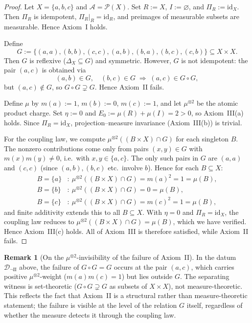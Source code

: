 \documentclass[11pt]{article}
\numberwithin{equation}{section}
\theoremstyle{definition}
\newtheorem{remark}[theorem]{Remark}
\begin{document}
\begin{proof}
Let $X=\{a,b,c\}$ and $\mathcal A=\mathcal P(X)$. Set $R:=X$, $I:=\varnothing$, and $\Pi_R:=\mathrm{id}_X$. Then $\Pi_R$ is idempotent, $\Pi_R|_R=\mathrm{id}_R$, and preimages of measurable subsets are measurable. Hence Axiom~I holds.

Define
\[
G:=\{(a,a),(b,b),(c,c),(a,b),(b,a),(b,c),(c,b)\}\subseteq X\times X.
\]
Then $G$ is reflexive ($\Delta_X\subseteq G$) and symmetric. However, $G$ is not idempotent: the pair $(a,c)$ is obtained via
\[
(a,b)\in G,\quad (b,c)\in G \;\Longrightarrow\; (a,c)\in G\circ G,
\]
but $(a,c)\notin G$, so $G\circ G\supsetneq G$. Hence Axiom~II fails.

Define $\mu$ by $m(a):=1$, $m(b):=0$, $m(c):=1$, and let $\mu^{\otimes2}$ be the atomic product charge. Set $\eta:=0$ and $E_0:=\mu(R)+\mu(I)=2>0$, so Axiom~III(a) holds. Since $\Pi_R=\mathrm{id}_X$, projection--measure invariance (Axiom~III(b)) is trivial.

For the coupling law, we compute $\mu^{\otimes2}((B\times X)\cap G)$ for each singleton $B$. The nonzero contributions come only from pairs $(x,y)\in G$ with $m(x)m(y)\ne 0$, i.e.\ with $x,y\in\{a,c\}$. The only such pairs in $G$ are $(a,a)$ and $(c,c)$ (since $(a,b),(b,c)$ etc.\ involve $b$). Hence for each $B\subseteq X$:
\begin{align*}
B=\{a\}&:\ \mu^{\otimes2}((B\times X)\cap G)=m(a)^2=1=\mu(B),\\
B=\{b\}&:\ \mu^{\otimes2}((B\times X)\cap G)=0=\mu(B),\\
B=\{c\}&:\ \mu^{\otimes2}((B\times X)\cap G)=m(c)^2=1=\mu(B),
\end{align*}
and finite additivity extends this to all $B\subseteq X$. With $\eta=0$ and $\Pi_R=\mathrm{id}_X$, the coupling law reduces to $\mu^{\otimes2}((B\times X)\cap G)=\mu(B)$, which we have verified. Hence Axiom~III(c) holds. All of Axiom~III is therefore satisfied, while Axiom~II fails.
\end{proof}

\begin{remark}[On the $\mu^{\otimes2}$-invisibility of the failure of Axiom~II]\label{rem:II-invisibility}
In the datum $\mathcal D_{\neg \mathrm{II}}$ above, the failure of $G\circ G=G$ occurs at the pair $(a,c)$, which carries positive $\mu^{\otimes2}$-weight ($m(a)m(c)=1$) but lies outside $G$. The separating witness is set-theoretic ($G\circ G\supsetneq G$ as subsets of $X\times X$), not measure-theoretic. This reflects the fact that Axiom~II is a structural rather than measure-theoretic statement; the failure is visible at the level of the relation $G$ itself, regardless of whether the measure detects it through the coupling law.
\end{remark}
\end{document}

